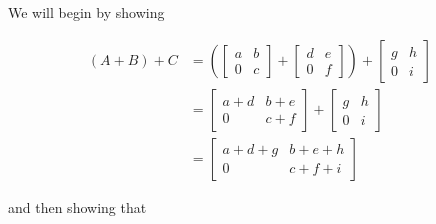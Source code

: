 \documentclass{article}
\begin{document}
        \noindent We will begin by showing 

        \begin{equation*}
          \begin{split}
            (A+B)+C &= \left( 
              \begin{bmatrix}
                a & b\\
                0 & c
              \end{bmatrix} + 
              \begin{bmatrix}
                d & e\\
                0 & f
              \end{bmatrix}
            \right) + 
            \begin{bmatrix} 
              g & h\\
              0 & i
            \end{bmatrix}\\
            &=
              \begin{bmatrix}
                a+d & b+e\\
                0 & c+f
              \end{bmatrix}
              +
              \begin{bmatrix}
                g & h\\
                0 & i
              \end{bmatrix}\\
            &=
              \begin{bmatrix}
                a+d+g & b+e+h\\
                0 & c+f+i
              \end{bmatrix}
          \end{split}
        \end{equation*}

        \noindent and then showing that 
        
\end{document}
